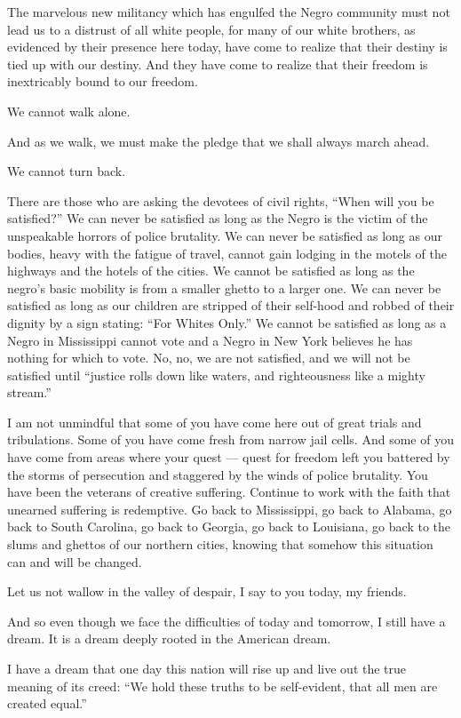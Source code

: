 \documentclass[a4paper]{amsbook}
\begin{document}
The marvelous new militancy which has engulfed the Negro community must not lead us to a distrust of all white people, for many of our white brothers, as evidenced by their presence here today, have come to realize that their destiny is tied up with our destiny. And they have come to realize that their freedom is inextricably bound to our freedom.

We cannot walk alone.

And as we walk, we must make the pledge that we shall always march ahead.

We cannot turn back.

There are those who are asking the devotees of civil rights, “When will you be satisfied?” We can never be satisfied as long as the Negro is the victim of the unspeakable horrors of police brutality. We can never be satisfied as long as our bodies, heavy with the fatigue of travel, cannot gain lodging in the motels of the highways and the hotels of the cities. We cannot be satisfied as long as the negro's basic mobility is from a smaller ghetto to a larger one. We can never be satisfied as long as our children are stripped of their self-hood and robbed of their dignity by a sign stating: “For Whites Only.” We cannot be satisfied as long as a Negro in Mississippi cannot vote and a Negro in New York believes he has nothing for which to vote. No, no, we are not satisfied, and we will not be satisfied until “justice rolls down like waters, and righteousness like a mighty stream.”

I am not unmindful that some of you have come here out of great trials and tribulations. Some of you have come fresh from narrow jail cells. And some of you have come from areas where your quest — quest for freedom left you battered by the storms of persecution and staggered by the winds of police brutality. You have been the veterans of creative suffering. Continue to work with the faith that unearned suffering is redemptive. Go back to Mississippi, go back to Alabama, go back to South Carolina, go back to Georgia, go back to Louisiana, go back to the slums and ghettos of our northern cities, knowing that somehow this situation can and will be changed.

Let us not wallow in the valley of despair, I say to you today, my friends.

And so even though we face the difficulties of today and tomorrow, I still have a dream. It is a dream deeply rooted in the American dream.

I have a dream that one day this nation will rise up and live out the true meaning of its creed: “We hold these truths to be self-evident, that all men are created equal.”
\end{document}
